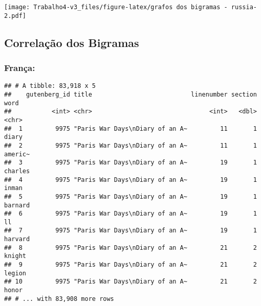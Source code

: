 \documentclass[]{article}
\newenvironment{Shaded}{\begin{snugshade}}{\end{snugshade}}
\newcommand{\DataTypeTok}[1]{\textcolor[rgb]{0.13,0.29,0.53}{#1}}
\newcommand{\DecValTok}[1]{\textcolor[rgb]{0.00,0.00,0.81}{#1}}
\newcommand{\KeywordTok}[1]{\textcolor[rgb]{0.13,0.29,0.53}{\textbf{#1}}}
\newcommand{\NormalTok}[1]{#1}
\newcommand{\OperatorTok}[1]{\textcolor[rgb]{0.81,0.36,0.00}{\textbf{#1}}}
\newcommand{\StringTok}[1]{\textcolor[rgb]{0.31,0.60,0.02}{#1}}
\begin{document}
\texttt{[image: Trabalho4-v3\_files/figure-latex/grafos dos bigramas - russia-2.pdf]}

\hypertarget{correlacao-dos-bigramas}{%
\subsection{Correlação dos Bigramas}\label{correlacao-dos-bigramas}}

\hypertarget{franca-6}{%
\subsubsection{França:}\label{franca-6}}

\begin{Shaded}
\end{Shaded}

\begin{verbatim}
## # A tibble: 83,918 x 5
##    gutenberg_id title                           linenumber section word   
##           <int> <chr>                                <int>   <dbl> <chr>  
##  1         9975 "Paris War Days\nDiary of an A~         11       1 diary  
##  2         9975 "Paris War Days\nDiary of an A~         11       1 americ~
##  3         9975 "Paris War Days\nDiary of an A~         19       1 charles
##  4         9975 "Paris War Days\nDiary of an A~         19       1 inman  
##  5         9975 "Paris War Days\nDiary of an A~         19       1 barnard
##  6         9975 "Paris War Days\nDiary of an A~         19       1 ll     
##  7         9975 "Paris War Days\nDiary of an A~         19       1 harvard
##  8         9975 "Paris War Days\nDiary of an A~         21       2 knight 
##  9         9975 "Paris War Days\nDiary of an A~         21       2 legion 
## 10         9975 "Paris War Days\nDiary of an A~         21       2 honor  
## # ... with 83,908 more rows
\end{verbatim}
\end{document}
